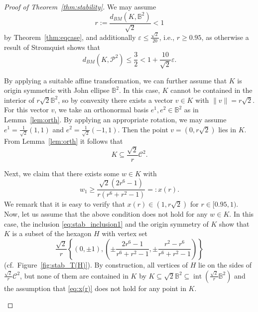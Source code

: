 \documentclass[12pt,a4paper]{article}
\theoremstyle{definition}
\DeclareMathOperator{\inte}{int}
\newcommand\B{\mathbb{B}}
\newcommand\CC{\mathcal{C}}
\newcommand\CP{\mathcal{P}}
\begin{document}
\begin{proof}[Proof of Theorem~\ref{thm:stability}]
We may assume
$$ r := \frac{d_{BM}(K,\B^2)}{\sqrt{2}} < 1 $$
by Theorem~\ref{thm:eqcase}, and additionally $\varepsilon \leq \frac{\sqrt{2}}{20}$, i.e., $r \geq 0.95$, as otherwise a result of Stromquist \cite{stromquist} shows that
$$ d_{BM}(K,\CP^2) \leq \frac{3}{2} < 1 + \frac{10}{\sqrt{2}} \varepsilon. $$

By applying a suitable affine transformation, we can further assume that $K$ is origin symmetric with John ellipse $\B^2$. In this case, $K$ cannot be contained in the interior of $r \sqrt{2} \B^2$, so by convexity there exists a vector $v \in K$  with $\|v\| = r \sqrt{2}$. For this vector $v$, we take an orthonormal basis $e^1, e^2 \in \B^2$ as in Lemma~\ref{lem:orth}. By applying an appropriate rotation, we may assume $e^1 = \frac{1}{\sqrt{2}} (1, 1)$ and $e^2 = \frac{1}{\sqrt{2}} (-1, 1)$. Then the point $v = (0, r \sqrt{2})$ lies in $K$. From Lemma~\ref{lem:orth} it follows that 
\begin{equation}
\label{eq:stab_inclusion1}
K \subseteq \frac{\sqrt{2}}{r} \CC^2.
\end{equation}

Next, we claim that there exists some $w \in K$ with
\begin{equation}
\label{eq:x(r)}
w_1 \geq \frac{\sqrt{2} (2 r^6 - 1)}{r (r^6 + r^2 - 1)} =: x(r).
\end{equation}
We remark that it is easy to verify that $x(r) \in \left( 1,r \sqrt{2} \right)$ for $r \in [0.95,1)$. Now, let us assume that the above condition does not hold for any $w \in K$. In this case, the inclusion \eqref{eq:stab_inclusion1} and the origin symmetry of $K$ show that $K$ is a subset of the hexagon $H$ with vertex set
$$ \frac{\sqrt{2}}{r} \left\{ ( 0, \pm 1 ), \left( \pm \frac{2 r^6 - 1}{r^6 + r^2 - 1}, \pm \frac{r^2 - r^6}{r^6 + r^2 - 1} \right) \right\} $$
(cf.~Figure~\ref{fig:stab_T(H)}). By construction, all vertices of $H$ lie on the sides of $\frac{\sqrt{2}}{r} \CC^2$, but none of them are contained in $K$ by $K \subseteq \sqrt{2} \B^2 \subseteq \inte( \frac{\sqrt{2}}{r} \B^2)$ and the assumption that \eqref{eq:x(r)} does not hold for any point in $K$.



\begin{figure}[ht]
\def\d{1.35}
\def\r{(\d/sqrt(2))}
\def\xr{(sqrt(2)*(2*\r^6-1)/(\r*(\r^6+\r^2-1)))}
\def\a{(\r^2*sqrt((2*\r^2-1)/(2*\r^6-1)))}
\def\b{(\d^2/2)}
\def\sq{(sqrt(2))}
\def\scale{2.0}
%
\centering
{}
\end{figure}
\end{proof}
\end{document}
